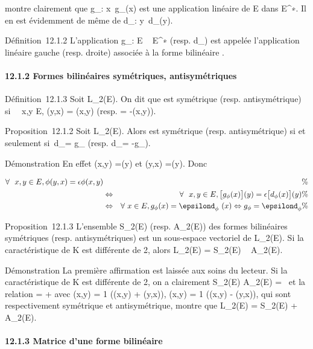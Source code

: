 \documentclass[]{article}
\begin{document}
montre clairement que g_\phi :
x\mapsto~g_\phi(x) est une application
linéaire de E dans E^∗. Il en est évidemment de même de
d_\phi : y\mapsto~d_\phi(y).

Définition~12.1.2 L'application g_\phi : E \rightarrow~ E^∗ (resp.
d_\phi) est appelée l'application linéaire gauche (resp. droite)
associée à la forme bilinéaire \phi.

\paragraph{12.1.2 Formes bilinéaires symétriques, antisymétriques}

Définition~12.1.3 Soit \phi \in L_2(E). On dit que \phi est symétrique
(resp. antisymétrique) si \forall~~x,y \in E, \phi(y,x) =
\phi(x,y) (resp. = -\phi(x,y)).

Proposition~12.1.2 Soit \phi \in L_2(E). Alors \phi est symétrique
(resp. antisymétrique) si et seulement si~d_\phi = g_\phi
(resp. d_\phi = -g_\phi).

Démonstration En effet \phi(x,y) =(y) et \phi(y,x)
=(y). Donc

\begin{align*} \forall~~x,y \in E,
\phi(y,x) = \epsilon\phi(x,y)&& \%& \\ &
\Leftrightarrow & \forall~~x,y \in E,
\big [g_\phi(x)\big ](y) =
\epsilon\big [d_\phi(x)\big ](y) \%&
\\ & \Leftrightarrow &
\forall~x \in E, g_\phi(x) = \epsilond_\phi~(x)
\Leftrightarrow g_\phi = \epsilond_\phi\%&
\\ \end{align*}

Proposition~12.1.3 L'ensemble S_2(E) (resp. A_2(E))
des formes bilinéaires symétriques (resp. antisymétriques) est un
sous-espace vectoriel de L_2(E). Si la caractéristique de K est
différente de 2, alors L_2(E) = S_2(E) \oplus~
A_2(E).

Démonstration La première affirmation est laissée aux soins du lecteur.
Si la caractéristique de K est différente de 2, on a clairement
S_2(E) \bigcap A_2(E) =
\0\ et la relation \phi = \psi + \theta avec
\psi(x,y) = 1  (\phi(x,y) + \phi(y,x)), \theta(x,y) = 1
 (\phi(x,y) - \phi(y,x)), qui sont respectivement
symétrique et antisymétrique, montre que L_2(E) =
S_2(E) + A_2(E).

\paragraph{12.1.3 Matrice d'une forme bilinéaire}
\end{document}
